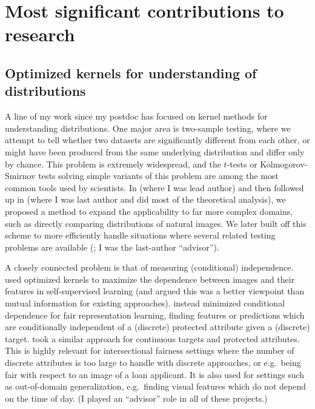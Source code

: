 \documentclass[12pt]{article}
\begin{document}
\nocite{*}

\section{Most significant contributions to research}

\subsection{Optimized kernels for understanding of distributions} \label{sec:testing}

A line of my work since my postdoc has focused on kernel methods for understanding distributions.
One major area is two-sample testing,
where we attempt to tell whether two datasets are significantly different from each other,
or might have been produced from the same underlying distribution and differ only by chance.
This problem is extremely widespread,
and the $t$-tests or Kolmogorov-Smirnov tests solving simple variants of this problem
are among the most common tools used by scientists.
In \cite{sutherland:opt-mmd} (where I was lead author)
and then followed up in \cite{liu:deep-testing} (where I was last author and did most of the theoretical analysis),
we proposed a method to expand the applicability to far more complex domains,
such as directly comparing distributions of natural images.
We later built off this scheme to more efficiently handle situations where several related testing problems are available (\cite{liu:meta-2st}; I was the last-author ``advisor'').

A closely connected problem is that of measuring (conditional) independence.
\cite{li:ssl-hsic} used optimized kernels to maximize the dependence between images and their features in self-supervised learning
(and argued this was a better viewpoint than mutual information for existing approaches).
\Cite{deka:mmd-bfair} instead minimized conditional dependence for fair representation learning,
finding features or predictions which are conditionally independent of a (discrete) protected attribute given a (discrete) target.
\cite{pogodin:circe} took a similar approach for continuous targets and protected attributes.
This is highly relevant for intersectional fairness settings where the number of discrete attributes is too large to handle with discrete approaches,
or e.g.\ being fair with respect to an image of a loan applicant.
It is also used for settings such as out-of-domain generalization,
e.g.\ finding visual features which do not depend on the time of day.
(I played an ``advisor'' role in all of these projects.)
\end{document}
